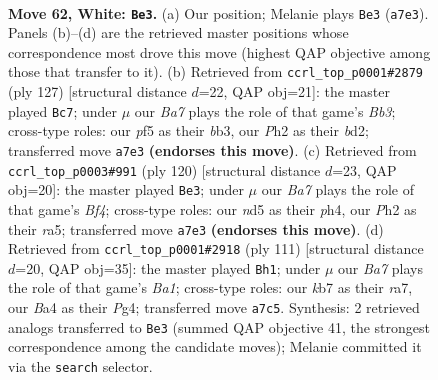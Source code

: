\documentclass[11pt]{article}
\begin{document}
\clearpage

\begin{figure}[p]\centering
\begin{subfigure}{0.46\textwidth}\centering
\resizebox{\linewidth}{!}{%
\newchessgame
\chessboard[
  setfen={8/Bkp3R1/8/3n1p2/B4P2/8/3K3P/8 w - - 5 62},
  showmover=false,
  pgfstyle=straightmove, color=movearrow, markmove={a7-e3}
]}
\caption{}
\end{subfigure}\hfill
\begin{subfigure}{0.46\textwidth}\centering
\resizebox{\linewidth}{!}{%
\newchessgame
\chessboard[
  setfen={3k4/6r1/1b6/4N3/6P1/1B1p4/3B2K1/8 b - - 8 64},
  showmover=false,
  pgfstyle=straightmove, color=movearrow, markmove={b6-c7}
]}
\caption{}
\end{subfigure}
\\[4pt]
\begin{subfigure}{0.46\textwidth}\centering
\resizebox{\linewidth}{!}{%
\newchessgame
\chessboard[
  setfen={b7/P2R2pk/8/r7/5B1p/8/5K2/8 w - - 0 61},
  showmover=false,
  pgfstyle=straightmove, color=movearrow, markmove={f4-e3}
]}
\caption{}
\end{subfigure}\hfill
\begin{subfigure}{0.46\textwidth}\centering
\resizebox{\linewidth}{!}{%
\newchessgame
\chessboard[
  setfen={b7/R7/P3k3/8/1P4p1/2N1K3/8/r7 b - - 3 56},
  showmover=false,
  pgfstyle=straightmove, color=movearrow, markmove={a8-h1}
]}
\caption{}
\end{subfigure}
\caption{\textbf{Move 62, White: \texttt{Be3}.} (a) Our position; Melanie plays \texttt{Be3} (\texttt{a7e3}). Panels (b)--(d) are the retrieved master positions whose correspondence most drove this move (highest QAP objective among those that transfer to it). (b) Retrieved from \texttt{ccrl\_top\_p0001\#2879} (ply 127) [structural distance $d$=22, QAP obj=21]: the master played \texttt{Bc7}; under $\mu$ our \emph{Ba7} plays the role of that game's \emph{Bb3}; cross-type roles: our \emph{p}f5 as their \emph{b}b3, our \emph{P}h2 as their \emph{b}d2; transferred move \texttt{a7e3} \textbf{(endorses this move)}. (c) Retrieved from \texttt{ccrl\_top\_p0003\#991} (ply 120) [structural distance $d$=23, QAP obj=20]: the master played \texttt{Be3}; under $\mu$ our \emph{Ba7} plays the role of that game's \emph{Bf4}; cross-type roles: our \emph{n}d5 as their \emph{p}h4, our \emph{P}h2 as their \emph{r}a5; transferred move \texttt{a7e3} \textbf{(endorses this move)}. (d) Retrieved from \texttt{ccrl\_top\_p0001\#2918} (ply 111) [structural distance $d$=20, QAP obj=35]: the master played \texttt{Bh1}; under $\mu$ our \emph{Ba7} plays the role of that game's \emph{Ba1}; cross-type roles: our \emph{k}b7 as their \emph{r}a7, our \emph{B}a4 as their \emph{P}g4; transferred move \texttt{a7c5}. Synthesis: 2 retrieved analogs transferred to \texttt{Be3} (summed QAP objective 41, the strongest correspondence among the candidate moves); Melanie committed it via the \texttt{search} selector.}
\label{fig:thought-m122}
\end{figure}
\end{document}
